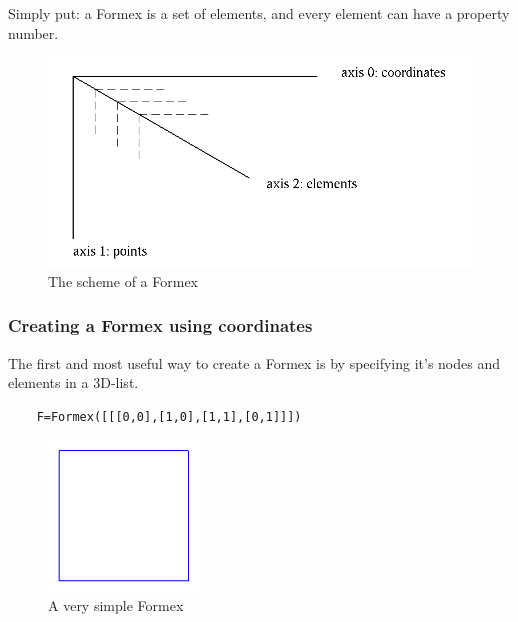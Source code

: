 Simply put: a Formex is a set of elements, and every element can have a property number.
\begin{figure}[ht]
  \centering
  \begin{makeimage}
  \end{makeimage}
  \begin{latexonly}
    \includegraphics{images/Formex}
  \end{latexonly}
  \begin{htmlonly}
  \end{htmlonly}  
  \caption{The scheme of a Formex}
\end{figure}

\subsubsection{Creating a Formex using coordinates}
The first and most useful way to create a Formex is by specifying it's nodes and elements in a 3D-list.  

\begin{verbatim}
	F=Formex([[[0,0],[1,0],[1,1],[0,1]]])
\end{verbatim}

\begin{figure}[ht]
  \centering
  \begin{makeimage}
  \end{makeimage}
  \begin{latexonly}
    \includegraphics[width=4cm]{images/square}
  \end{latexonly}
  \begin{htmlonly}
  \end{htmlonly}  
  \caption{A very simple Formex}
  \label{fig:square}
\end{figure}

